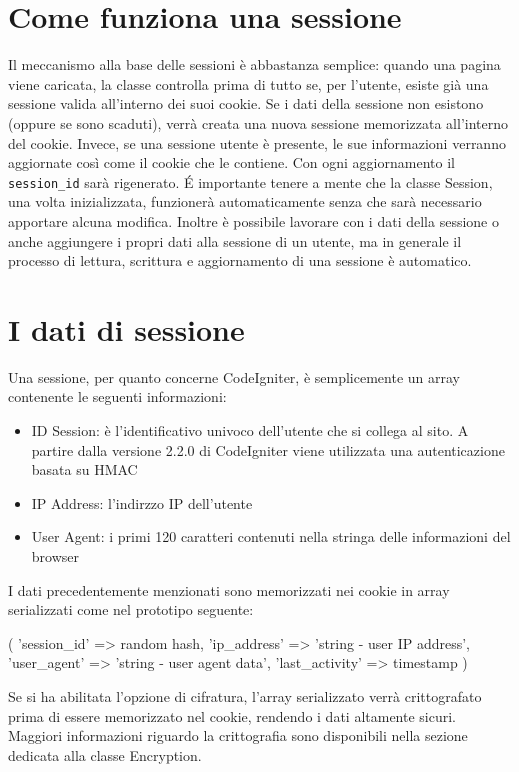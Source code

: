 \section*{Come funziona una sessione}
Il meccanismo alla base delle sessioni è abbastanza semplice: quando una pagina viene caricata, la classe controlla prima di tutto se, per l'utente, esiste già una sessione valida all'interno dei suoi cookie. Se i dati della sessione non esistono (oppure se sono scaduti), verrà creata una nuova sessione memorizzata all'interno del cookie. Invece, se una sessione utente è presente, le sue informazioni verranno aggiornate così come il cookie che le contiene. Con ogni aggiornamento il \verb|session_id| sarà rigenerato. \'E importante tenere a mente che la classe Session, una volta inizializzata, funzionerà automaticamente senza che sarà necessario apportare alcuna modifica. Inoltre è possibile lavorare con i dati della sessione o anche aggiungere i propri dati alla sessione di un utente, ma in generale il processo di lettura, scrittura e aggiornamento di una sessione è automatico.

\section*{I dati di sessione}
Una sessione, per quanto concerne CodeIgniter, è semplicemente un array contenente le seguenti informazioni:

\begin{itemize}
\item ID Session: è l'identificativo univoco dell'utente che si collega al sito. A partire dalla versione 2.2.0 di CodeIgniter viene utilizzata una autenticazione basata su \ac{HMAC}
\item IP Address: l'indirzzo IP dell'utente
\item User Agent: i primi 120 caratteri contenuti nella stringa delle informazioni del browser
\end{itemize}

I dati precedentemente menzionati sono memorizzati nei cookie in array serializzati come nel prototipo seguente:

\begin{code}
[array]
(
     'session_id'    => random hash,
     'ip_address'    => 'string - user IP address',
     'user_agent'    => 'string - user agent data',
     'last_activity' => timestamp
)
\end{code}

Se si ha abilitata l'opzione di cifratura, l'array serializzato verrà crittografato prima di essere memorizzato nel cookie, rendendo i dati altamente sicuri. Maggiori informazioni riguardo la crittografia sono disponibili nella sezione dedicata alla classe Encryption.

